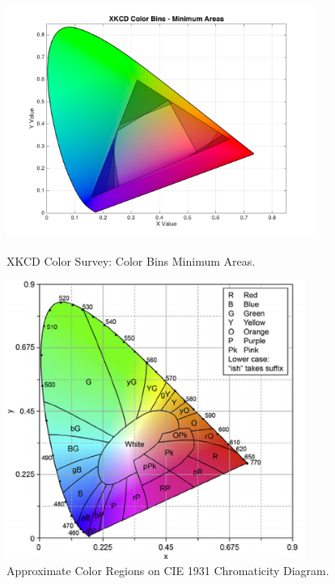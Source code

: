 \begin{figure}[!htbp]
  \centering
  \begin{minipage}{0.54\textwidth}
    \centering
    \includegraphics[width=0.9\textwidth]{images/results/colorbins_areas.png}
    \caption[XKCD Color Survey: Color Bins Minimum Areas]{XKCD Color Survey: Color Bins Minimum Areas.}
    \label{fig:colorbins_areas}
  \end{minipage}\hfill
  \begin{minipage}{0.45\textwidth}
    \centering
    \includegraphics[width=0.87\textwidth]{images/results/cie_colors.png}
    \caption[Approximate Color Regions on CIE 1931 Chromaticity Diagram]{Approximate Color Regions on CIE 1931 Chromaticity Diagram. \cite{Fortner1997}}
    \label{fig:cie_colorregions}
  \end{minipage}
\end{figure} \par
